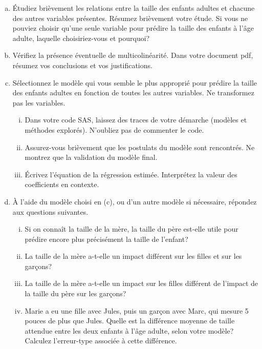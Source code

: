 \documentclass[letter, 11pt]{article}
\begin{document}
\begin{enumerate}[(a)]
\item Étudiez brièvement les relations entre la taille des enfants adultes et chacune des autres variables présentes. Résumez brièvement votre étude. Si vous ne pouviez choisir qu'une seule variable pour prédire la taille des enfants à l'âge adulte, laquelle choisiriez-vous et pourquoi?
%
\item Vérifiez la présence éventuelle de multicolinéarité. Dans votre document pdf, résumez vos conclusions et vos justifications.  
%
\item Sélectionnez le modèle qui vous semble le plus approprié pour prédire la taille des enfants adultes en fonction de toutes les autres variables. Ne transformez pas les variables.
    \begin{enumerate}[(i)]
    \item Dans votre code SAS, laissez des traces de votre démarche (modèles et méthodes explorés). N'oubliez pas de commenter le code.
    \item Assurez-vous brièvement que les postulats du modèle sont rencontrés. Ne montrez que la validation du modèle final.
    \item  Écrivez l'équation de la régression estimée. Interprétez la valeur des coefficients en contexte.
    \end{enumerate}
\item  À l'aide du modèle choisi en (c), ou d'un autre modèle si nécessaire, répondez aux questions suivantes.
    \begin{enumerate}[(i)]
    \item Si on connaît la taille de la mère, la taille du père est-elle utile pour prédire encore plus précisément la taille de l'enfant? %
    \item La taille de la mère a-t-elle un impact différent sur les filles et sur les garçons? %
    \item La taille de la mère a-t-elle un impact sur les filles différent de l'impact de la taille du père sur les garçons? %
    \item Marie a eu une fille avec Jules, puis un garçon avec Marc, qui mesure 5 pouces de plus que Jules. Quelle est la différence moyenne de taille attendue entre les deux enfants à l'âge adulte, selon votre modèle? Calculez l'erreur-type associée à cette différence.
    \end{enumerate}
    

\end{enumerate}
\end{document}

